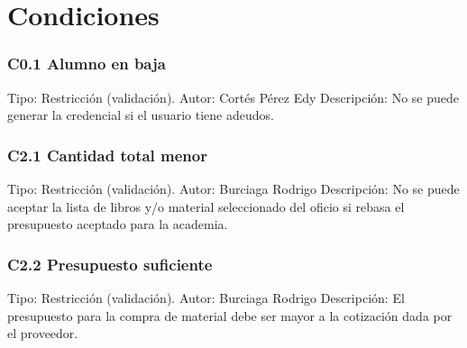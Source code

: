 \chapter{Condiciones}
\label{appendix:Condiciones}

\subsection{C0.1 Alumno en baja }
	\UCli Tipo: Restricción (validación).
	\UCli Autor: Cortés Pérez Edy
	\UCli Descripción: No se puede generar la credencial si el usuario tiene adeudos.
	




\subsection{C2.1 Cantidad total menor}
	\UCli Tipo: Restricción (validación).
	\UCli Autor: Burciaga Rodrigo
	\UCli Descripción: No se puede aceptar la lista de libros y/o material seleccionado del oficio  si rebasa el presupuesto aceptado para la academia.

\subsection{C2.2 Presupuesto suficiente}
	\UCli Tipo: Restricción (validación).
	\UCli Autor: Burciaga Rodrigo
	\UCli Descripción: El presupuesto para la compra de material debe ser mayor a la cotización dada por el proveedor.











